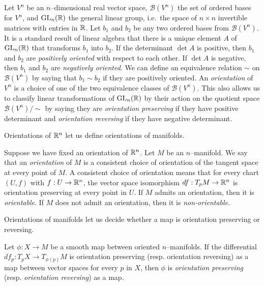 \begin{defn}
	\label{def:orientation}
	Let $V^n$ be an $n$--dimensional real vector space, $\mathcal{B}(V^n)$ the set of ordered bases for $V^n$, and $\textrm{GL}_{n}(\mathbb{R})$ the general linear group, i.e.\ the space of $n\times n$ invertible matrices with entries in $\mathbb{R}$.
	Let $b_1$ and $b_2$ be any two ordered bases from $\mathcal{B}(V^n)$.
	It is a standard result of linear algebra that there is a unique element $A$ of $\textrm{GL}_{n}(\mathbb{R})$ that transforms $b_1$ into $b_2$.
	If the determinant $\det A$ is positive, then $b_1$ and $b_2$ are \emph{positively oriented} with respect to each other.
	If $\det A$ is negative, then $b_1$ and $b_2$ are \emph{negatively oriented}.
	We can define an equivalence relation $\sim$ on $\mathcal{B}(V^n)$ by saying that $b_1\sim b_2$ if they are positively oriented.
	An \emph{orientation} of $V^n$ is a choice of one of the two equivalence classes of $\mathcal{B}(V^n)$.
	This also allows us to classify linear transformations of $\textrm{GL}_{n}(\mathbb{R})$ by their action on the quotient space $\mathcal{B}(V^n)/\sim$ by saying they are \emph{orientation preserving} if they have positive determinant and \emph{orientation reversing} if they have negative determinant.
\end{defn}

Orientations of $\mathbb{R}^n$ let us define orientations of manifolds.

\begin{defn}
	Suppose we have fixed an orientation of $\mathbb{R}^n$.
	Let $M$ be an $n$--manifold.
	We say that an \emph{orientation} of $M$ is a consistent choice of orientation of the tangent space at every point of $M$.
	A consistent choice of orientation means that for every chart $(U,f)$ with $f:U\to\mathbb{R}^n$, the vector space isomorphism $df:T_p M\to \mathbb{R}^n$ is orientation preserving at every point in $U$. 
	If $M$ admits an orientation, then it is \emph{orientable}.
	If $M$ does not admit an orientation, then it is \emph{non-orientable}.	
\end{defn}

Orientations of manifolds let us decide whether a map is orientation preserving or reversing.

\begin{defn}
	Let $\phi:X\to M$ be a smooth map between oriented $n$--manifolds.
	If the differential $df_p:T_p X\to T_{\phi(p)} M$ is orientation preserving (resp. orientation reversing) as a map between vector spaces for every $p$ in $X$, then $\phi$ is \emph{orientation preserving} (resp. \emph{orientation reversing}) as a map.
\end{defn}
